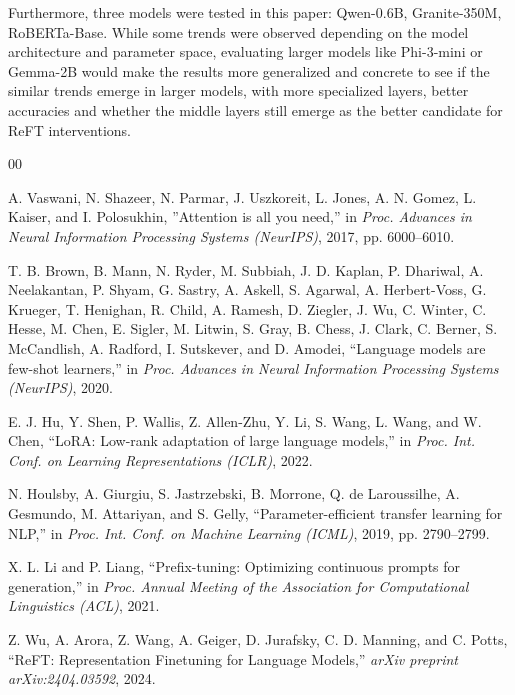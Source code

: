 \documentclass[conference]{IEEEtran}
\begin{document}
	Furthermore, three models were tested in this paper: Qwen-0.6B, Granite-350M, RoBERTa-Base. While some trends were observed depending on the model architecture and parameter space, evaluating larger models like Phi-3-mini or Gemma-2B would make the results more generalized and concrete to see if the similar trends emerge in larger models, with more specialized layers, better accuracies and whether the middle layers still emerge as the better candidate for ReFT interventions.
	
	\begin{thebibliography}{00}
		
		A. Vaswani, N. Shazeer, N. Parmar, J. Uszkoreit, L. Jones, A. N. Gomez, L. Kaiser, and I. Polosukhin, ''Attention is all you need,'' in \textit{Proc. Advances in Neural Information Processing Systems (NeurIPS)}, 2017, pp. 6000--6010.
		
		T. B. Brown, B. Mann, N. Ryder, M. Subbiah, J. D. Kaplan, P. Dhariwal, A. Neelakantan, P. Shyam, G. Sastry, A. Askell, S. Agarwal, A. Herbert-Voss, G. Krueger, T. Henighan, R. Child, A. Ramesh, D. Ziegler, J. Wu, C. Winter, C. Hesse, M. Chen, E. Sigler, M. Litwin, S. Gray, B. Chess, J. Clark, C. Berner, S. McCandlish, A. Radford, I. Sutskever, and D. Amodei, ``Language models are few-shot learners,'' in \textit{Proc. Advances in Neural Information Processing Systems (NeurIPS)}, 2020.
		
		E. J. Hu, Y. Shen, P. Wallis, Z. Allen-Zhu, Y. Li, S. Wang, L. Wang, and W. Chen, ``LoRA: Low-rank adaptation of large language models,'' in \textit{Proc. Int. Conf. on Learning Representations (ICLR)}, 2022.
		
		N. Houlsby, A. Giurgiu, S. Jastrzebski, B. Morrone, Q. de Laroussilhe, A. Gesmundo, M. Attariyan, and S. Gelly, ``Parameter-efficient transfer learning for NLP,'' in \textit{Proc. Int. Conf. on Machine Learning (ICML)}, 2019, pp. 2790--2799.
		
		X. L. Li and P. Liang, ``Prefix-tuning: Optimizing continuous prompts for generation,'' in \textit{Proc. Annual Meeting of the Association for Computational Linguistics (ACL)}, 2021.
		
		Z. Wu, A. Arora, Z. Wang, A. Geiger, D. Jurafsky, C. D. Manning, and C. Potts, ``ReFT: Representation Finetuning for Language Models,'' \textit{arXiv preprint arXiv:2404.03592}, 2024.
		

\end{thebibliography}
\end{document}
